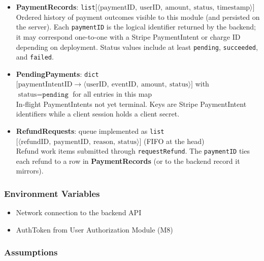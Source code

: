 \documentclass[12pt, titlepage]{article}
\begin{document}
\begin{itemize}

    \item \textbf{PaymentRecords}: \texttt{list}$\bigl[\langle \text{paymentID},\ \text{userID},\ \text{amount},\ \text{status},\ \text{timestamp}\rangle\bigr]$\\
    Ordered history of payment outcomes visible to this module (and persisted on the server). Each \texttt{paymentID} is the logical identifier returned by the backend; it may correspond one-to-one with a Stripe PaymentIntent or charge ID depending on deployment. Status values include at least \texttt{pending}, \texttt{succeeded}, and \texttt{failed}.

    \item \textbf{PendingPayments}: \texttt{dict}$\bigl[\text{paymentIntentID} \rightarrow \langle \text{userID},\ \text{eventID},\ \text{amount},\ \text{status}\rangle\bigr]$ with $\text{status} = \texttt{pending}$ for all entries in this map\\
    In-flight PaymentIntents not yet terminal. Keys are Stripe PaymentIntent identifiers while a client session holds a client secret.

    \item \textbf{RefundRequests}: queue implemented as \texttt{list}$\bigl[\langle \text{refundID},\ \text{paymentID},\ \text{reason},\ \text{status}\rangle\bigr]$ (FIFO at the head)\\
    Refund work items submitted through \texttt{requestRefund}. The \texttt{paymentID} ties each refund to a row in \textbf{PaymentRecords} (or to the backend record it mirrors).

\end{itemize}


\subsubsection{Environment Variables}

\begin{itemize}
    \item Network connection to the backend API
    \item AuthToken from User Authorization Module (M8)
\end{itemize}

\subsubsection{Assumptions}
\end{document}
